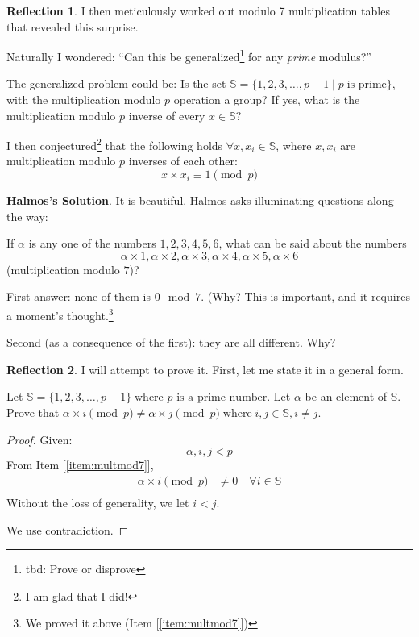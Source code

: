 \documentclass[english,notitlepage,smartquotes]{hgbreport}
\theoremstyle{definition}
\theoremstyle{definition}
\theoremstyle{remark}
\theoremstyle{definition}
\theoremstyle{plain}
\theoremstyle{definition}
\newtheorem{reflection}{Reflection}
\begin{document}
\begin{enumerate}
\begin{reflection}
I then meticulously worked out modulo 7 multiplication tables that revealed this surprise.

Naturally I wondered: ``Can this be generalized\footnote{tbd: Prove or disprove} for any \emph{prime} modulus?''

The generalized problem could be: Is the set $\mathbb{S}=\{1,2,3,\dots,p-1\mid p\;\text{is prime}\}$, with the multiplication modulo $p$ operation a group? If yes, what is the multiplication modulo $p$ inverse of every $x\in\mathbb{S}$?

I then conjectured\footnote{I am glad that I did!} that the following holds $\forall x, x_i\in\mathbb{S}$, where $x,x_i$ are multiplication modulo $p$ inverses of each other: 
$$
x\times x_i\equiv 1 \pmod p
$$

\end{reflection}

\textbf{Halmos's Solution}. It is beautiful. Halmos asks illuminating questions along the way: 

If $\alpha$ is any one of the numbers $1,2,3,4,5,6$, what can be said about the numbers
$$
\alpha\times1,
\alpha\times2,
\alpha\times3,
\alpha\times4,
\alpha\times5,
\alpha\times6
$$
(multiplication modulo $7$)?

First answer: none of them is $0 \mod 7$. (Why? This is important, and it requires a moment's thought.\footnote{We proved it above (Item [\ref{item:multmod7}])}

Second (as a consequence of the first): they are all different. Why?

\begin{reflection}
I will attempt to prove it. First, let me state it in a general form.

Let $\mathbb{S}=\{1,2,3,\dots,p-1\}\;\text{where $p$ is a prime number}$. Let $\alpha$ be an element of $\mathbb{S}$. Prove that $\alpha\times i\pmod p\ne\alpha\times j\pmod p\;\text{where}\;i,j\in\mathbb{S}, i\ne j$.

\begin{proof}
Given:
$$
\alpha,i,j<p
$$
From Item [\ref{item:multmod7}], 
$$
$$
\begin{equation}
\begin{aligned}
\alpha\times i\pmod p&\ne 0\quad\forall i\in\mathbb{S}\\
\end{aligned}\label{eq:aimodp}
\end{equation}
Without the loss of generality, we let $i<j$.

We use contradiction. 


\end{proof}
\end{reflection}
\end{enumerate}
\end{document}
